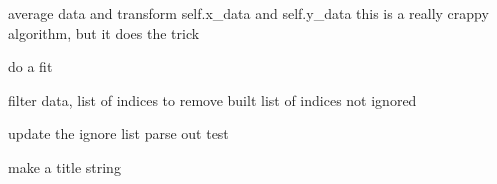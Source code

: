 \documentclass[letterpaper,10pt,english]{sphinxmanual}
\begin{document}
\begin{fulllineitems}
\begin{fulllineitems}
\end{fulllineitems}


\begin{fulllineitems}
\label{VisualPlotter:Visualplotterwidget.VisualPlotter.avg_data}
average data and transform self.x\_data and self.y\_data
this is a really crappy algorithm, but it does the trick

\end{fulllineitems}


\begin{fulllineitems}
\label{VisualPlotter:Visualplotterwidget.VisualPlotter.do_fit}
do a fit

\end{fulllineitems}


\begin{fulllineitems}
\label{VisualPlotter:Visualplotterwidget.VisualPlotter.filter_ignore}
filter data, list of indices to remove
built list of indices not ignored

\end{fulllineitems}


\begin{fulllineitems}
\label{VisualPlotter:Visualplotterwidget.VisualPlotter.ignore_update}
update the ignore list parse out test

\end{fulllineitems}


\begin{fulllineitems}
\label{VisualPlotter:Visualplotterwidget.VisualPlotter.make_title_string}
make a title string

\end{fulllineitems}



\end{fulllineitems}
\end{document}
